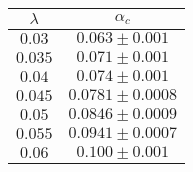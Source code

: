 \begin{tabular}{c c}
    \toprule
    $\lambda$ & $\alpha_c$           \\ \midrule
    $0.03$    & $0.063 \pm 0.001$    \\
    $0.035$   & $0.071 \pm 0.001$    \\
    $0.04$    & $0.074 \pm 0.001 $   \\
    $0.045$   & $0.0781 \pm 0.0008 $ \\
    $0.05$    & $0.0846 \pm 0.0009$  \\
    $0.055$   & $0.0941 \pm 0.0007 $ \\
    $0.06$    & $0.100 \pm 0.001 $   \\
    \bottomrule
\end{tabular}